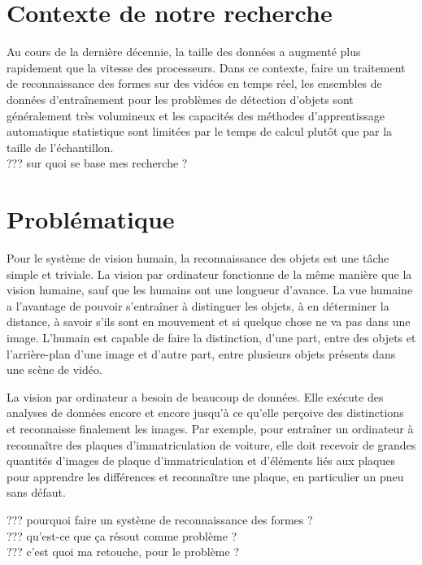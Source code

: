 		

	\section{Contexte de notre recherche}
		Au cours de la dernière décennie, la taille des données a augmenté plus rapidement que la vitesse des processeurs. 
		Dans ce contexte, faire un traitement de reconnaissance des formes sur des vidéos en temps réel, les ensembles de données d'entraînement pour les problèmes de détection d'objets sont généralement très volumineux et les capacités des méthodes d'apprentissage automatique statistique sont limitées par le temps de calcul plutôt que par la taille de l'échantillon.\cite{bottou2010large} 
		\\??? sur quoi se base mes recherche ?
	
	\section{Problématique}
		
		Pour le système de vision humain, la reconnaissance des objets est une tâche simple et triviale.
		La vision par ordinateur fonctionne de la même manière que la vision humaine, sauf que les humains ont une longueur d'avance. La vue humaine a l'avantage de pouvoir s'entraîner à distinguer les objets, à en déterminer la distance, à savoir s'ils sont en mouvement et si quelque chose ne va pas dans une image. 
		L'humain est capable de faire la distinction, d'une part, entre des objets et l'arrière-plan d'une image et d'autre part, entre plusieurs objets présents dans une scène de vidéo.
		
		La vision par ordinateur a besoin de beaucoup de données. Elle exécute des analyses de données encore et encore jusqu'à ce qu'elle perçoive des distinctions et reconnaisse finalement les images. Par exemple, pour entraîner un ordinateur à reconnaître des plaques d'immatriculation de voiture, elle doit recevoir de grandes quantités d'images de plaque d'immatriculation et d'éléments liés aux plaques pour apprendre les différences et reconnaître une plaque, en particulier un pneu sans défaut.
		
	
		??? pourquoi faire un système de reconnaissance des formes ?
		\\??? qu'est-ce que ça résout comme problème ?
		\\??? c'est quoi ma retouche, pour le problème ?
	
